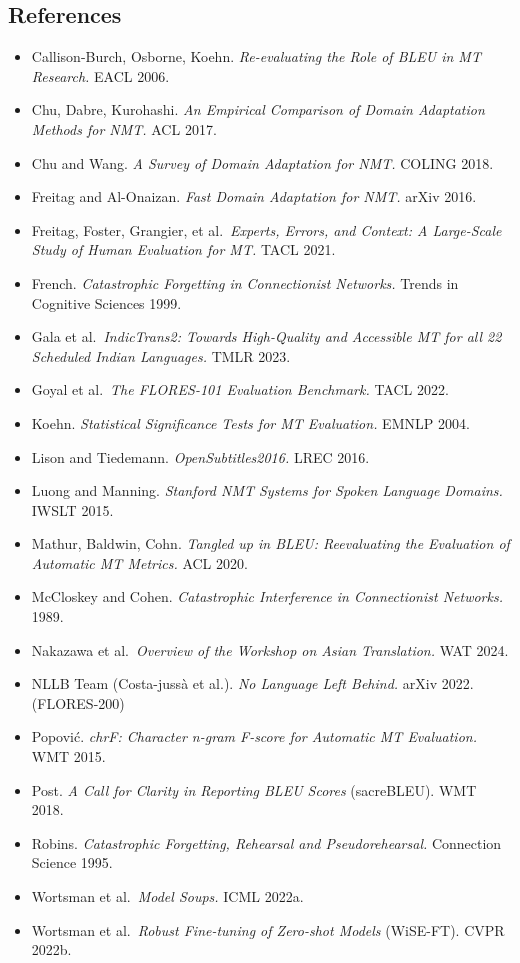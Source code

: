 \documentclass[
  11pt,
]{article}
\providecommand{\tightlist}{%
  \setlength{\itemsep}{0pt}\setlength{\parskip}{0pt}}
\begin{document}
\hypertarget{references}{%
\subsection{References}\label{references}}

\begin{itemize}
\tightlist
\item
  Callison-Burch, Osborne, Koehn. \emph{Re-evaluating the Role of BLEU
  in MT Research.} EACL 2006.
\item
  Chu, Dabre, Kurohashi. \emph{An Empirical Comparison of Domain
  Adaptation Methods for NMT.} ACL 2017.
\item
  Chu and Wang. \emph{A Survey of Domain Adaptation for NMT.} COLING
  2018.
\item
  Freitag and Al-Onaizan. \emph{Fast Domain Adaptation for NMT.} arXiv
  2016.
\item
  Freitag, Foster, Grangier, et al.~\emph{Experts, Errors, and Context:
  A Large-Scale Study of Human Evaluation for MT.} TACL 2021.
\item
  French. \emph{Catastrophic Forgetting in Connectionist Networks.}
  Trends in Cognitive Sciences 1999.
\item
  Gala et al.~\emph{IndicTrans2: Towards High-Quality and Accessible MT
  for all 22 Scheduled Indian Languages.} TMLR 2023.
\item
  Goyal et al.~\emph{The FLORES-101 Evaluation Benchmark.} TACL 2022.
\item
  Koehn. \emph{Statistical Significance Tests for MT Evaluation.} EMNLP
  2004.
\item
  Lison and Tiedemann. \emph{OpenSubtitles2016.} LREC 2016.
\item
  Luong and Manning. \emph{Stanford NMT Systems for Spoken Language
  Domains.} IWSLT 2015.
\item
  Mathur, Baldwin, Cohn. \emph{Tangled up in BLEU: Reevaluating the
  Evaluation of Automatic MT Metrics.} ACL 2020.
\item
  McCloskey and Cohen. \emph{Catastrophic Interference in Connectionist
  Networks.} 1989.
\item
  Nakazawa et al.~\emph{Overview of the Workshop on Asian Translation.}
  WAT 2024.
\item
  NLLB Team (Costa-jussà et al.). \emph{No Language Left Behind.} arXiv
  2022. (FLORES-200)
\item
  Popović. \emph{chrF: Character n-gram F-score for Automatic MT
  Evaluation.} WMT 2015.
\item
  Post. \emph{A Call for Clarity in Reporting BLEU Scores} (sacreBLEU).
  WMT 2018.
\item
  Robins. \emph{Catastrophic Forgetting, Rehearsal and Pseudorehearsal.}
  Connection Science 1995.
\item
  Wortsman et al.~\emph{Model Soups.} ICML 2022a.
\item
  Wortsman et al.~\emph{Robust Fine-tuning of Zero-shot Models}
  (WiSE-FT). CVPR 2022b.
\end{itemize}
\end{document}
